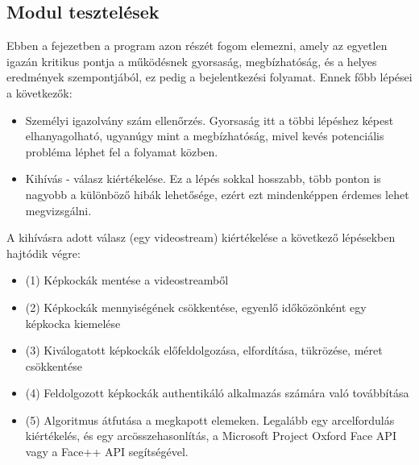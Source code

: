\subsection{Modul tesztelések}
Ebben a fejezetben a program azon részét fogom elemezni, amely az egyetlen igazán kritikus pontja a működésnek gyorsaság, megbízhatóság, és a helyes eredmények szempontjából, ez pedig a bejelentkezési folyamat. Ennek főbb lépései a következők:
\begin{itemize}
\item Személyi igazolvány szám ellenőrzés. Gyorsaság itt a többi lépéshez képest elhanyagolható, ugyanúgy mint a megbízhatóság, mivel kevés potenciális probléma léphet fel a folyamat közben.
\item  Kihívás - válasz kiértékelése. Ez a lépés sokkal hosszabb, több ponton is nagyobb a különböző hibák lehetősége, ezért ezt mindenképpen érdemes lehet megvizsgálni.
\end{itemize}
A kihívásra adott válasz (egy videostream) kiértékelése a következő lépésekben hajtódik végre:
\begin{itemize}
\item (1) Képkockák mentése a videostreamből
\item (2) Képkockák mennyiségének csökkentése, egyenlő időközönként egy képkocka kiemelése
\item (3) Kiválogatott képkockák előfeldolgozása, elfordítása, tükrözése, méret csökkentése
\item (4) Feldolgozott képkockák authentikáló alkalmazás számára való továbbítása
\item (5) Algoritmus átfutása a megkapott elemeken. Legalább egy arcelfordulás kiértékelés, és egy arcösszehasonlítás, a Microsoft Project Oxford Face API vagy a Face++ API segítségével.
\end{itemize}

